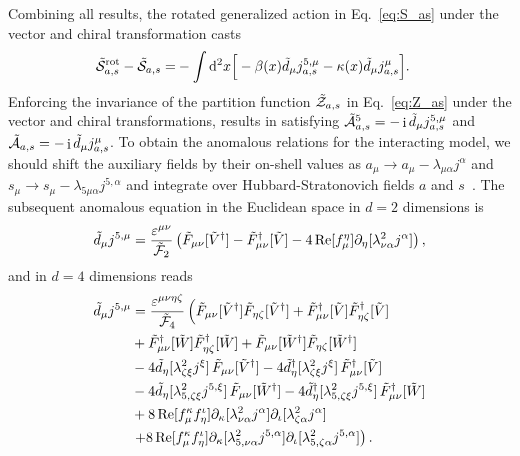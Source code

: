 \documentclass[prl,aps,showpacs,twocolumn,preprintnumbers,
amsmath,amssymb,superscriptaddress,longbibliography]{revtex4-1}
\renewcommand{\Re}{\mathop{\mathrm{Re}}}
\renewcommand{\i}{\mathop{\mathrm{i}}}
\begin{document}
 Combining all results, the rotated generalized action in Eq.~\eqref{eq:S_as} under the vector and chiral transformation casts
 \begin{align}
\label{eq:currentrot}
    \tilde{\cal S}_{a,s}^{{\rm rot }} -\tilde{\cal S}_{a,s} =& -  \int {\rm d}^{2} x   \Big[-\beta(x)  \tilde{d}_{\mu}  j_{a,s}^{5,\mu} 
    - \kappa(x) 
      \tilde{d}_{\mu}  j_{a,s}^{\mu} \Big].
\end{align}
Enforcing the invariance of the partition function $\tilde{\cal Z}_{a,s}$ in Eq.~\eqref{eq:Z_as} under the vector and chiral transformations, results in satisfying $\tilde{\cal A}_{a,s}^{5}= -\i \tilde{d}_{\mu}  j_{a,s}^{5,\mu} $ and $\tilde{\cal A}_{a,s}= -\i \tilde{d}_{\mu}  j_{a,s}^{\mu}$. To obtain the anomalous relations for the interacting model, we should shift the auxiliary fields by their on-shell values as $a_{\mu}\rightarrow a_{\mu} - \lambda_{\mu \alpha} j^{\alpha}$ and $s_{\mu}\rightarrow s_{\mu} - \lambda_{5\mu \alpha} j^{5,\alpha}$ and integrate over Hubbard-Stratonovich fields $a$ and $s$~\cite{Parhizkar2023}. The subsequent anomalous equation in the Euclidean space in $d=2$ dimensions is
 \begin{equation}
 \tilde{d}_{\mu}  j^{5,\mu} =\frac{ \varepsilon^{\mu \nu} }{\tilde{\cal F}_{2}} 
       \left(
  \tilde{F}_{\mu \nu}[ \tilde{V}^{\dagger}] 
         -
  \tilde{F}^{\dagger}_{\mu \nu}[ \tilde{V}] 
  -
   4 \Re[f_{\mu}^{\eta}] \partial_{\eta}[ \lambda_{\nu \alpha}^{2} j^{\alpha}]
 \right)
,\label{eq:dj5_2} 
 \end{equation}
 and in $d=4$ dimensions reads
    \begin{align}
 \tilde{d}_{\mu}  j^{5,\mu}
 &=
   \frac{   \varepsilon^{\mu \nu \eta \zeta}}{\tilde{\cal F}_{4}} 
     \left(
\tilde{F}_{\mu \nu}[ \tilde{V}^{\dagger}] 
\tilde{F}_{\eta \zeta}[ \tilde{V}^{\dagger}] 
+
 \tilde{F}^{\dagger}_{\mu \nu}[ \tilde{V}] 
\tilde{F}^{\dagger}_{\eta \zeta}[ \tilde{V}] 
  \right.
    \nonumber \\
  &
+
\tilde{F}^{\dagger}_{\mu \nu} [\tilde{W}]
  \tilde{F}^{\dagger}_{\eta\zeta} [\tilde{W}]
  +
 \tilde{F}_{\mu \nu} [\tilde{W}^{\dagger}]
 \tilde{F}_{\eta \zeta} [\tilde{W}^{\dagger}]
 \nonumber \\
 &
- 4 
\tilde{d}_{\eta} [ \lambda^{2}_{\zeta \xi} j^{\xi}] 
\,
\tilde{F}_{\mu \nu}[ \tilde{V}^{\dagger}] 
-4
\tilde{d}_{\eta }^{\dagger} [ \lambda^{2}_{\zeta \xi} j^{\xi}] 
\,
 \tilde{F}^{\dagger}_{\mu \nu}[ \tilde{V}] 
 \nonumber \\
 &
- 4
\tilde{d}_{\eta} [ \lambda^{2}_{5,\zeta \xi} j^{5,\xi}] 
\,
\tilde{F}_{\mu \nu}[ \tilde{W}^{\dagger}] 
-4
\tilde{d}_{\eta }^{\dagger} [ \lambda^{2}_{5,\zeta \xi} j^{5,\xi}] 
\,
 \tilde{F}^{\dagger}_{\mu \nu}[ \tilde{W}] 
  \nonumber \\
&
   +
   8 \Re[f_{\mu }^{ \kappa} f_{\eta }^{ \iota}]
   \partial_{\kappa} [\lambda^{2}_{\nu \alpha} j^{\alpha}] 
    \partial_{\iota} [\lambda^{2}_{\zeta \alpha} j^{\alpha}] 
   \nonumber \\
 &
   \left.
   +
   8 \Re[f_{\mu }^{ \kappa} f_{\eta }^{ \iota}]
   \partial_{\kappa} [\lambda^{2}_{5,\nu \alpha} j^{5,\alpha}] 
    \partial_{\iota} [\lambda^{2}_{5,\zeta \alpha} j^{5,\alpha}] 
 \right)
.\label{eq:dj5_4}
\end{align} 
\end{document}
